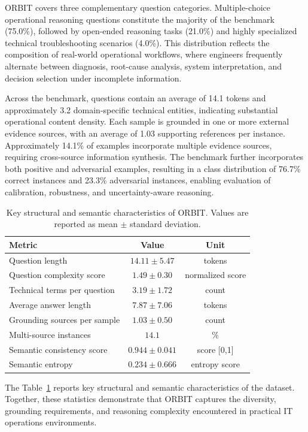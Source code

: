 \documentclass[conference]{IEEEtran}
\begin{document}
ORBIT covers three complementary question categories. Multiple-choice operational reasoning questions constitute the majority of the benchmark (75.0\%), followed by open-ended reasoning tasks (21.0\%) and highly specialized technical troubleshooting scenarios (4.0\%). This distribution reflects the composition of real-world operational workflows, where engineers frequently alternate between diagnosis, root-cause analysis, system interpretation, and decision selection under incomplete information.

Across the benchmark, questions contain an average of 14.1 tokens and approximately 3.2 domain-specific technical entities, indicating substantial operational content density. Each sample is grounded in one or more external evidence sources, with an average of 1.03 supporting references per instance. Approximately 14.1\% of examples incorporate multiple evidence sources, requiring cross-source information synthesis. The benchmark further incorporates both positive and adversarial examples, resulting in a class distribution of 76.7\% correct instances and 23.3\% adversarial instances, enabling evaluation of calibration, robustness, and uncertainty-aware reasoning.

\begin{table}[t]
\centering
\caption{Key structural and semantic characteristics of ORBIT. Values are reported as mean $\pm$ standard deviation.}
\label{tab:orbit_feature_statistics}
\begin{tabular}{lcc}
\toprule
\textbf{Metric} & \textbf{Value} & \textbf{Unit} \\
\midrule
Question length & $14.11 \pm 5.47$ & tokens \\
Question complexity score & $1.49 \pm 0.30$ & normalized score \\
Technical terms per question & $3.19 \pm 1.72$ & count \\
Average answer length & $7.87 \pm 7.06$ & tokens \\
Grounding sources per sample & $1.03 \pm 0.50$ & count \\
Multi-source instances & $14.1$ & \% \\
Semantic consistency score & $0.944 \pm 0.041$ & score [0,1] \\
Semantic entropy & $0.234 \pm 0.666$ & entropy score \\
\bottomrule
\end{tabular}
\end{table}

The Table~\ref{tab:orbit_feature_statistics} reports key structural and semantic characteristics of the dataset. Together, these statistics demonstrate that ORBIT captures the diversity, grounding requirements, and reasoning complexity encountered in practical IT operations environments.
\end{document}
